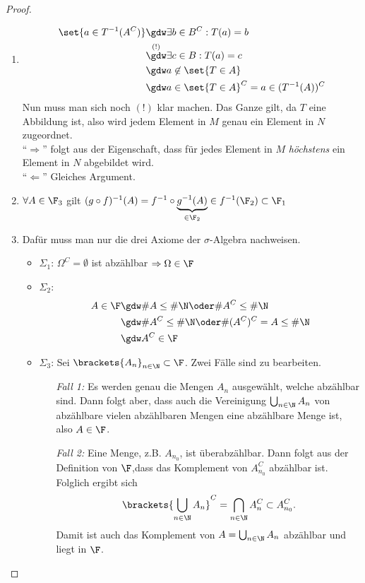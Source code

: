 \begin{proof}
	\begin{enumerate}[label=\alph*)]
		\item 
		\begin{align*}
			\set{a \in T^{-1}(A^C)} &\gdw \exists b \in B^C : T(a) = b\\
			&\overset{(!)}{\gdw} \exists c \in B : T(a) = c\\
			&\gdw a \not\in \set{T \in A}\\
			&\gdw a \in \set{T \in A}^C = a \in (T^{-1}(A))^C
		\end{align*}
		Nun muss man sich noch $(!)$ klar machen. Das Ganze gilt, da $T$ eine Abbildung ist, also wird jedem Element in $M$ genau ein Element in $N$ zugeordnet.\\
		``$\Rightarrow$'' folgt aus der Eigenschaft, dass für jedes Element in $M$ \emph{höchstens} ein Element in $N$ abgebildet wird.\\
		``$\Leftarrow$'' Gleiches Argument.
		\item $\forall A \in \F_3$ gilt $(g\circ f)^{-1}(A) = f^{-1}\circ \underbrace{g^{-1}(A)}_{\in \F_2} \in f^{-1}(\F_2)\subset \F_1$
		\item Dafür muss man nur die drei Axiome der $\sigma$-Algebra nachweisen.
		\begin{itemize}
			\item $\Sigma_1$: $\Omega^C = \emptyset$ ist abzählbar $\Rightarrow \Omega \in \F$
			\item $\Sigma_2$: 
			\begin{align*}
				A \in \F &\gdw \#A \le \#\N \oder \# A^C \le \# \N\\
				&\gdw \# A^C \le \# \N \oder \# (A^C)^C = A \le \#\N\\
				&\gdw A^C \in \F
			\end{align*}
			\item $\Sigma_3$: Sei $\brackets{A_n}_{n \in \N} \subset \F$. Zwei Fälle sind zu bearbeiten.
			\begin{itemize}
				\item[\textit{Fall 1:}] Es werden genau die Mengen $A_n$ ausgewählt, welche abzählbar sind. Dann folgt aber, dass auch die Vereinigung $\bigcup_{n\in \N} A_n$ von abzählbare vielen abzählbaren Mengen eine abzählbare Menge ist, also $A \in \F$.
				\item[\textit{Fall 2:}] Eine Menge, z.B. $A_{n_0}$, ist überabzählbar. Dann folgt aus der Definition von $\F$,dass das Komplement von $A_{n_0}^C$ abzählbar ist. Folglich ergibt sich
				\begin{align*}
					\brackets{\bigcup_{n\in \N} A_n}^C = \bigcap_{n\in \N} A_n^C \subset A^C_{n_0}.
				\end{align*} 
				Damit ist auch das Komplement von $A = \bigcup_{n\in \N}A_n$ abzählbar und liegt in $\F$.
			\end{itemize}
		\end{itemize}
	\end{enumerate}
\end{proof}

